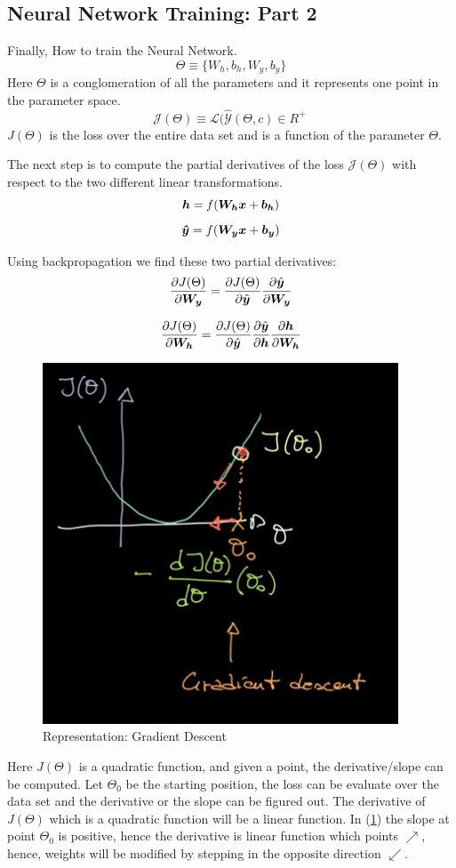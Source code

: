 \subsection{Neural Network Training: Part 2}
Finally, How to train the Neural Network. 
\[\Theta \equiv \{ W_h, b_h , W_y, b_y \} \]
Here $\Theta$ is  a conglomeration of all the parameters and it represents one point in the parameter space.  
\[
   \mathcal{J}(\Theta) \equiv \mathcal{L}(\hat{\mathcal{Y}}(\Theta,c) \in R^+\
\]
$J(\Theta)$ is the loss over the entire data set and is a function of the parameter $\Theta$.

The next step is to compute the partial derivatives of the loss $\mathcal{J}(\Theta)$ with respect to the two different linear transformations. 
\[\matr{h} = f(\matr{W_h} \matr{x} + \vect{b_h})\]
\[\matr{\hat{y}} = f(\matr{W_y} \matr{x} + \vect{b_y})\]

Using backpropagation we find these two partial derivatives:
\[
    \frac{\partial J(\Theta)}{\partial \matr{W_y}} = 
    \frac{\partial J(\Theta)}{\partial \hat{\vect{y}}}
    \frac{\partial \hat{\vect{y}}}{\partial \matr{W_y}}
\]
    
\[
\frac{\partial J(\Theta)}{\partial \matr{W_h}} =
\frac{\partial J(\Theta)}{\partial \hat{\vect{y}}}
\frac{\partial \hat{\vect{y}}}{\partial \matr{h}}
\frac{\partial \matr{h}}{\partial \matr{W_h}}
\]


\begin{figure}[ht]
    \centering
    \includegraphics[width=300pt]{labs/02/images/gradient_descent.jpg}
    \caption{Representation: Gradient Descent}
    \label{fig:gradient_descent}
\end{figure}

Here $J(\Theta)$ is a  quadratic function, and given a point, the derivative/slope can be computed.
Let $\Theta_0$ be the starting position, the loss can be evaluate over the data set and the derivative or the slope can be figured out.
The derivative of $J(\Theta)$ which is a quadratic function will be a linear function.
In (\cref{fig:gradient_descent}) the slope at point $\Theta_0$ is positive, hence the derivative is linear function which points $\nearrow$, hence, weights will be modified by stepping in the opposite direction $\swarrow$.